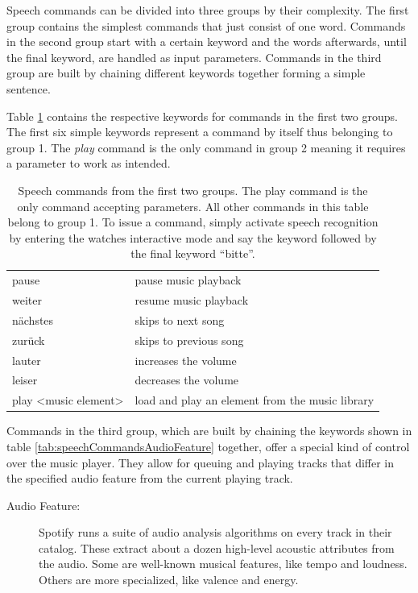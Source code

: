 Speech commands can be divided into three groups by their complexity. The first group contains the simplest commands that just consist of one word. Commands in the second group start with a certain keyword and the words afterwards, until the final keyword, are handled as input parameters. Commands in the third group are built by chaining different keywords together forming a simple sentence.

Table \ref{tab:speechCommands} contains the respective keywords for commands in the first two groups. The first six simple keywords represent a command by itself thus belonging to group 1. The \textit{play} command is the only command in group 2 meaning it requires a parameter to work as intended.
\newpage
\begin{table}[Hbt]
	\myfloatalign
	\begin{tabularx}{\textwidth}{XX} \toprule
		\tableheadline{Speech Command Keywords} & \tableheadline{Actions in Music Player} \\ 
		\midrule
		pause & pause music playback \\
		weiter & resume music playback \\
		n\"achstes & skips to next song \\
		zur\"uck & skips to previous song \\
		lauter & increases the volume \\
		leiser & decreases the volume \\
		\midrule
		play <music element> & load and play an element from the music library \\
		\bottomrule
	\end{tabularx}
	\caption{Speech commands from the first two groups. The play command is the only command accepting parameters. All other commands in this table belong to group 1. To issue a command, simply activate speech recognition by entering the watches interactive mode and say the keyword followed by the final keyword ``bitte''.}
	\label{tab:speechCommands}
\end{table}

Commands in the third group, which are built by chaining the keywords shown in table \ref{tab:speechCommandsAudioFeature} together, offer a special kind of control over the music player. They allow for queuing and playing tracks that differ in the specified audio feature from the current playing track.
\begin{description}
	\item[Audio Feature:] Spotify runs a suite of audio analysis algorithms on every track in their catalog. These extract about a dozen high-level acoustic attributes from the audio. Some are well-known musical features, like tempo and loudness. Others are more specialized, like valence and energy.
\end{description}

